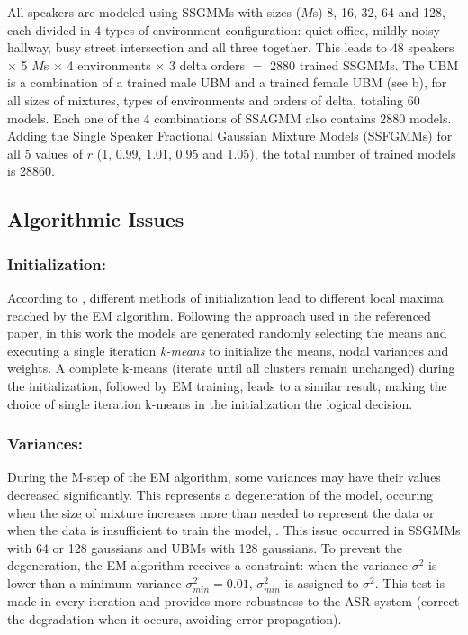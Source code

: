All speakers are modeled using SSGMMs with sizes ($M$s) 8, 16, 32, 64 and 128, each divided in 4 types of environment configuration: quiet office, mildly noisy hallway, busy street intersection and all three together. This leads to 48 speakers $\times$ 5 $M$s $\times$ 4 environments $\times$ 3 delta orders $=$ 2880 trained SSGMMs. The UBM is a combination of a trained male UBM and a trained female UBM (see b), for all sizes of mixtures, types of environments and orders of delta, totaling 60 models. Each one of the 4 combinations of SSAGMM also contains 2880 models. Adding the Single Speaker Fractional Gaussian Mixture Models (SSFGMMs) for all 5 values of $r$ (1, 0.99, 1.01, 0.95 and 1.05), the total number of trained models is 28860.

\subsection{Algorithmic Issues}

\subsubsection{Initialization:}

According to , different methods of initialization lead to different local maxima reached by the EM algorithm. Following the approach used in the referenced paper, in this work the models are generated randomly selecting the means and executing a single iteration \emph{k-means} to initialize the means, nodal variances and weights. A complete k-means (iterate until all clusters remain unchanged) during the initialization, followed by EM training, leads to a similar result, making the choice of single iteration k-means in the initialization the logical decision.

\subsubsection{Variances:}

During the M-step of the EM algorithm, some variances may have their values decreased significantly. This represents a degeneration of the model, occuring when the size of mixture increases more than needed to represent the data or when the data is insufficient to train the model, . This issue occurred in SSGMMs with 64 or 128 gaussians and UBMs with 128 gaussians. To prevent the degeneration, the EM algorithm receives a constraint: when the variance $\sigma^2$ is lower than a minimum variance $\sigma_{min}^2 = 0.01$, $\sigma_{min}^2$ is assigned to $\sigma^2$. This test is made in every iteration and provides more robustness to the ASR system (correct the degradation when it occurs, avoiding error propagation).

